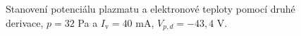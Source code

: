 \documentclass[a4paper,12pt]{article}
\begin{document}
\begin{figure}[h]
	\centering
	\begin{subfigure}[b]{.49\textwidth}
		\centering
	\end{subfigure}
	\begin{subfigure}[b]{.49\textwidth}
		\centering
	\end{subfigure}
	\caption{Stanovení potenciálu plazmatu a elektronové teploty pomocí druhé 
	derivace, $p = 32$ 
	\si{\pascal} a $I_\text{v} = 40$ \si{\milli\ampere}, $V_{p,d} = 
	-43,4$ V.}
	\label{data5sec}
\end{figure}
\end{document}
